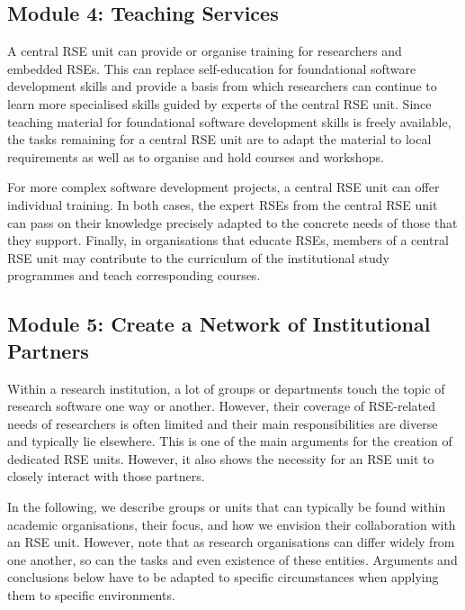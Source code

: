 \documentclass[a4paper]{article}
\begin{document}
\subsection{Module 4: Teaching Services}%
\label{sec:teaching}

A central RSE unit can provide or organise training for researchers and embedded RSEs.
This can replace self-education for foundational software development skills and provide a basis from which researchers can continue to learn more specialised skills guided by experts of the central RSE unit.
Since teaching material for foundational software development skills is freely available,
 the tasks remaining for a central RSE unit are to adapt the material to local requirements as well as to organise and hold courses and workshops.

For more complex software development projects, a central RSE unit can offer individual training.
In both cases, the expert RSEs from the central RSE unit can pass on their knowledge precisely adapted to the concrete needs of those that they support.
Finally, in organisations that educate RSEs, members of a central RSE unit may contribute to the curriculum of the institutional study programmes and teach corresponding courses.

\subsection{Module 5: Create a Network of Institutional Partners}%
\label{sec:partners}

Within a research institution, a lot of groups or departments touch the topic of research software one way or another.
However, their coverage of RSE-related needs of researchers is often limited and their main responsibilities are diverse and typically lie elsewhere.
This is one of the main arguments for the creation of dedicated RSE units.
However, it also shows the necessity for an RSE unit to closely interact with those partners.

In the following, we describe groups or units that can typically be found within academic organisations, their focus, and how we envision their collaboration with an RSE unit.
However, note that as research organisations can differ widely from one another, so can the tasks and even existence of these entities.
Arguments and conclusions below have to be adapted to specific circumstances when applying them to specific environments.
\end{document}
